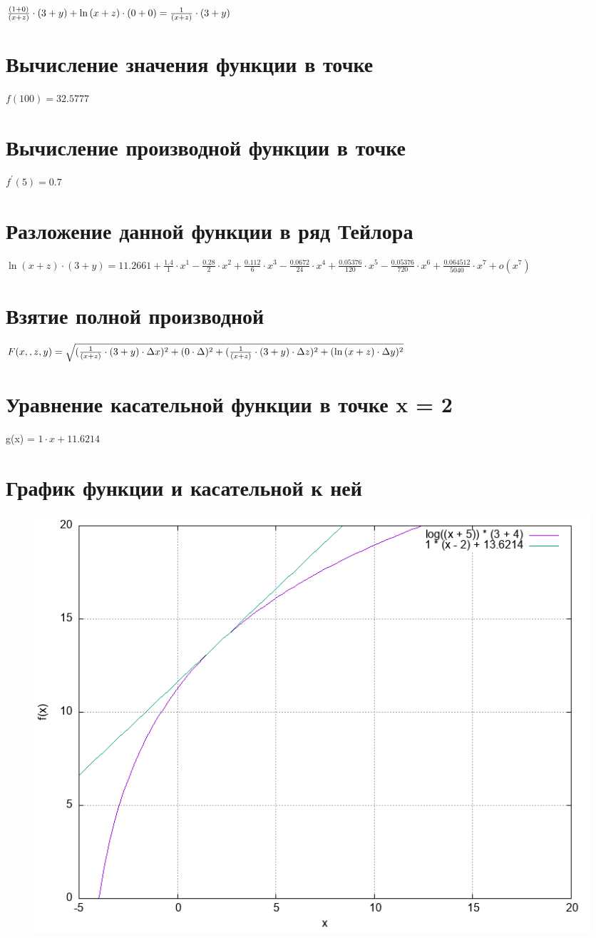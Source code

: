 \documentclass[a4paper,12pt]{article}
\begin{document}
${{{{({1} + {0})} \over {({x} + {z})}} \cdot {({3} + {y})}} + {{\ln{({x} + {z})}} \cdot {({0} + {0})}}} = {{{1} \over {({x} + {z})}} \cdot {({3} + {y})}}$
\section{Вычисление значения функции в точке}

$ f(100) = 32.5777 $
\section{Вычисление производной функции в точке}

$ f^{'}(5) = 0.7 $
\section{Разложение данной функции в ряд Тейлора}

${{\ln{({x} + {z})}} \cdot {({3} + {y})}} =  11.2661 + \frac{1.4}{1}\cdot x^1 - \frac{0.28}{2}\cdot x^2 + \frac{0.112}{6}\cdot x^3 - \frac{0.0672}{24}\cdot x^4 + \frac{0.05376}{120}\cdot x^5 - \frac{0.05376}{720}\cdot x^6 + \frac{0.064512}{5040}\cdot x^7 + o(x^7) $
\section{Взятие полной производной}

$F(x, , z, y) = \sqrt{({{{1} \over {({x} + {z})}} \cdot {({3} + {y})}} \cdot \Delta x)^2 + ({0} \cdot \Delta )^2 + ({{{1} \over {({x} + {z})}} \cdot {({3} + {y})}} \cdot \Delta z)^2 + ({\ln{({x} + {z})}} \cdot \Delta y)^2} $

\section{Уравнение касательной функции в точке x = 2}

g(x) = $1 \cdot  x + 11.6214 $
\section{График функции и касательной к ней}


\begin{figure}[ht]
\center
\includegraphics[scale=0.65]{graph.png}
\end{figure}
\end{document}
